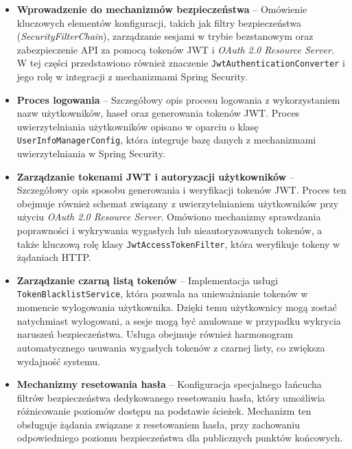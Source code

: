 \begin{itemize}
    \item \textbf{Wprowadzenie do mechanizmów bezpieczeństwa} -- Omówienie kluczowych elementów konfiguracji, takich jak filtry bezpieczeństwa (\emph{SecurityFilterChain}), zarządzanie sesjami w trybie bezstanowym oraz zabezpieczenie API za pomocą tokenów JWT i \emph{OAuth 2.0 Resource Server}. W tej części przedstawiono również znaczenie \texttt{JwtAuthenticationConverter} i jego rolę w integracji z mechanizmami Spring Security.

    \item \textbf{Proces logowania} -- Szczegółowy opis procesu logowania z wykorzystaniem nazw użytkowników, haseł oraz generowania tokenów JWT. Proces uwierzytelniania użytkowników opisano w oparciu o klasę \texttt{UserInfoManagerConfig}, która integruje bazę danych z mechanizmami uwierzytelniania w Spring Security.

    \item \textbf{Zarządzanie tokenami JWT i autoryzacji użytkowników} -- Szczegółowy opis sposobu generowania i weryfikacji tokenów JWT. Proces ten obejmuje również schemat związany z uwierzytelnianiem użytkowników przy użyciu \emph{OAuth 2.0 Resource Server}. Omówiono mechanizmy sprawdzania poprawności i wykrywania wygasłych lub nieautoryzowanych tokenów, a także kluczową rolę klasy \texttt{JwtAccessTokenFilter}, która weryfikuje tokeny w żądaniach HTTP.

    \item \textbf{Zarządzanie czarną listą tokenów} -- Implementacja usługi \texttt{TokenBlacklistService}, która pozwala na unieważnianie tokenów w momencie wylogowania użytkownika. Dzięki temu użytkownicy mogą zostać natychmiast wylogowani, a sesje mogą być anulowane w przypadku wykrycia naruszeń bezpieczeństwa. Usługa obejmuje również harmonogram automatycznego usuwania wygasłych tokenów z czarnej listy, co zwiększa wydajność systemu.

    \item \textbf{Mechanizmy resetowania hasła} -- Konfiguracja specjalnego łańcucha filtrów bezpieczeństwa dedykowanego resetowaniu hasła, który umożliwia różnicowanie poziomów dostępu na podstawie ścieżek. Mechanizm ten obsługuje żądania związane z resetowaniem hasła, przy zachowaniu odpowiedniego poziomu bezpieczeństwa dla publicznych punktów końcowych.

\end{itemize}



